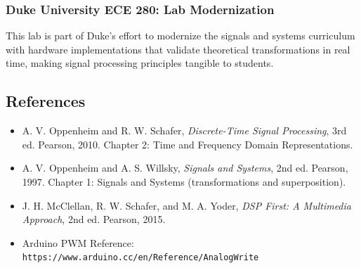 \documentclass[11pt,letterpaper]{article}
\begin{document}
\subsubsection*{Duke University ECE 280: Lab Modernization}

This lab is part of Duke's effort to modernize the signals and systems curriculum with hardware implementations that validate theoretical transformations in real time, making signal processing principles tangible to students.

\subsection*{References}

\begin{itemize}
    \item A. V. Oppenheim and R. W. Schafer, \textit{Discrete-Time Signal Processing}, 3rd ed. Pearson, 2010. Chapter 2: Time and Frequency Domain Representations.
    \item A. V. Oppenheim and A. S. Willsky, \textit{Signals and Systems}, 2nd ed. Pearson, 1997. Chapter 1: Signals and Systems (transformations and superposition).
    \item J. H. McClellan, R. W. Schafer, and M. A. Yoder, \textit{DSP First: A Multimedia Approach}, 2nd ed. Pearson, 2015.
    \item Arduino PWM Reference: \texttt{https://www.arduino.cc/en/Reference/AnalogWrite}
\end{itemize}
\end{document}
